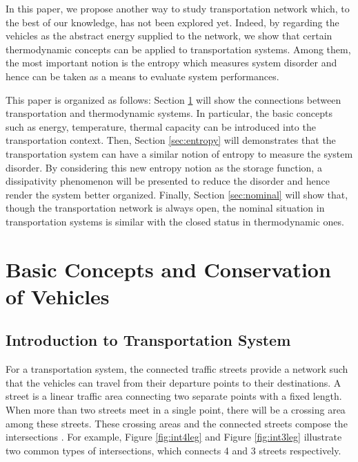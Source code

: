 \documentclass[preprint,authoryear,12pt]{elsarticle}
\begin{document}
In this paper, we propose another way to study transportation network
which, to the best of our knowledge,  has not been explored yet.
Indeed, by regarding the vehicles as the abstract energy supplied to
the network, we show that certain thermodynamic concepts can be
applied to transportation systems. Among them, the most important
notion is the entropy which measures system disorder and hence can be
taken as a means to evaluate system performances.

This paper is organized as follows: Section \ref{sec:concepts} will
show the connections between transportation and thermodynamic
systems. In particular, the basic concepts such as energy,
temperature, thermal capacity can be introduced into the
transportation context. Then, Section \ref{sec:entropy} will
demonstrates that the transportation system can have a similar notion
of entropy to measure the system disorder. By considering this new
entropy notion as the storage function, a dissipativity phenomenon
will be presented to reduce the disorder and hence render the system
better organized. Finally, Section \ref{sec:nominal} will show that,
though the transportation network is always open, the nominal
situation in transportation systems is similar with the closed status
in thermodynamic ones.

\section{Basic Concepts and Conservation of Vehicles}\label{sec:concepts}

\subsection{Introduction to Transportation System}

For a transportation system, the connected traffic streets provide a
network such that the vehicles can travel from their departure points
to their destinations. A street is a linear traffic area connecting
two separate points with a fixed length. When more than two streets
meet in a single point, there will be a crossing area among these
streets. These crossing areas and the connected streets compose the
intersections \citep{papageorgiou_review_2003}. For example, Figure
\ref{fig:int4leg} and Figure \ref{fig:int3leg} illustrate two common
types of intersections, which connects 4 and 3 streets respectively.
\end{document}
